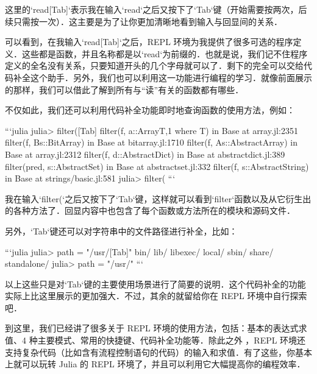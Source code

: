 这里的`read[Tab]`表示我在输入`read`之后又按下了`Tab`键（开始需要按两次，后续只需按一次）．这主要是为了让你更加清晰地看到输入与回显间的关系．

可以看到，在我输入`read[Tab]`之后，REPL 环境为我提供了很多可选的程序定义．这些都是函数，并且名称都是以`read`为前缀的．也就是说，我们记不住程序定义的全名没有关系，只要知道开头的几个字母就可以了．剩下的完全可以交给代码补全这个助手．另外，我们也可以利用这一功能进行编程的学习．就像前面展示的那样，我们可以借此了解到所有与“读”有关的函数都有哪些．

不仅如此，我们还可以利用代码补全功能即时地查询函数的使用方法，例如：

```julia
julia> filter([Tab]
filter(f, a::Array{T,1} where T) in Base at array.jl:2351
filter(f, Bs::BitArray) in Base at bitarray.jl:1710
filter(f, As::AbstractArray) in Base at array.jl:2312
filter(f, d::AbstractDict) in Base at abstractdict.jl:389
filter(pred, s::AbstractSet) in Base at abstractset.jl:332
filter(f, s::AbstractString) in Base at strings/basic.jl:581
julia> filter(
```

我在输入`filter(`之后又按下了`Tab`键，这样就可以看到`filter`函数以及从它衍生出的各种方法了．回显内容中也包含了每个函数或方法所在的模块和源码文件．

另外，`Tab`键还可以对字符串中的文件路径进行补全，比如：

```julia
julia> path = "/usr/[Tab]"
bin/        lib/         libexec/     local/       sbin/        share/       standalone/
julia> path = "/usr/"
```

以上这些只是对`Tab`键的主要使用场景进行了简要的说明．这个代码补全的功能实际上比这里展示的更加强大．不过，其余的就留给你在 REPL 环境中自行探索吧．

到这里，我们已经讲了很多关于 REPL 环境的使用方法，包括：基本的表达式求值、4 种主要模式、常用的快捷键、代码补全功能等．除此之外 ，REPL 环境还支持复杂代码（比如含有流程控制语句的代码）的输入和求值．有了这些，你基本上就可以玩转 Julia 的 REPL 环境了，并且可以利用它大幅提高你的编程效率．